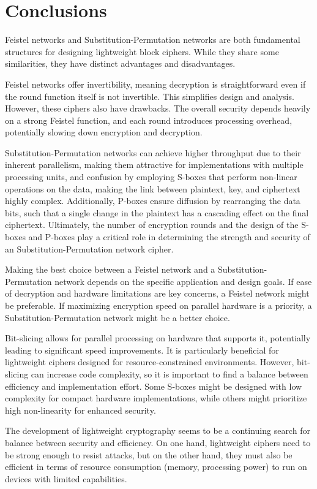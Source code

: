 \documentclass[conference]{IEEEtran}
\begin{document}
\section{Conclusions}\label{sec:conc}
Feistel networks and Substitution-Permutation networks are both fundamental structures for designing lightweight block ciphers. While they share some similarities, they have distinct advantages and disadvantages.

Feistel networks offer invertibility, meaning decryption is straightforward even if the round function itself is not invertible. This simplifies design and analysis. However, these ciphers also have drawbacks. The overall security depends heavily on a strong Feistel function, and each round introduces processing overhead, potentially slowing down encryption and decryption.

Substitution-Permutation networks can achieve higher throughput due to their inherent parallelism, making them attractive for implementations with multiple processing units, and confusion by employing S-boxes that perform non-linear operations on the data, making the link between plaintext, key, and ciphertext highly complex. Additionally, P-boxes ensure diffusion by rearranging the data bits, such that a single change in the plaintext has a cascading effect on the final ciphertext. Ultimately, the number of encryption rounds and the design of the S-boxes and P-boxes play a critical role in determining the strength and security of an Substitution-Permutation network cipher.

Making the best choice between a Feistel network and a Substitution-Permutation network depends on the specific application and design goals. If ease of decryption and hardware limitations are key concerns, a Feistel network might be preferable. If maximizing encryption speed on parallel hardware is a priority, a Substitution-Permutation network might be a better choice.

Bit-slicing allows for parallel processing on hardware that supports it, potentially leading to significant speed improvements. It is particularly beneficial for lightweight ciphers designed for resource-constrained environments. However, bit-slicing can increase code complexity, so it is important to find a balance between efficiency and implementation effort. Some S-boxes might be designed with low complexity for compact hardware implementations, while others might prioritize high non-linearity for enhanced security.

The development of lightweight cryptography seems to be a continuing search for balance between security and efficiency. On one hand, lightweight ciphers need to be strong enough to resist attacks, but on the other hand, they must also be efficient in terms of resource consumption (memory, processing power) to run on devices with limited capabilities.




\vspace{12pt}
\end{document}
